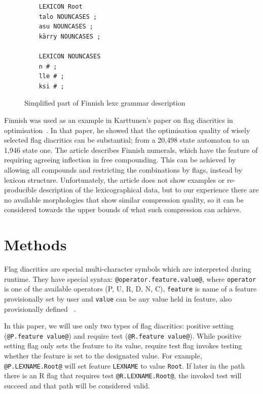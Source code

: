 \documentclass[11pt]{article}
\begin{document}
\begin{figure}
    \centering
    \begin{verbatim}
    LEXICON Root
    talo NOUNCASES ;
    asu NOUNCASES ;
    kärry NOUNCASES ;

    LEXICON NOUNCASES
    n # ;
    lle # ;
    ksi # ;
    \end{verbatim}
    \caption{Simplified part of Finnish lexc grammar description
    \label{fig:lexc-fin}}
\end{figure}

Finnish was used as an example in Karttunen's paper on flag diacritics
in optimisation~. In that paper, he
showed that the optimisation quality of wisely selected flag
diacritics can be substantial; from a 20,498 state automaton to an
1,946 state one. The article describes Finnish numerals, which have
the feature of requiring agreeing inflection in free compounding. This
can be achieved by allowing all compounds and restricting the
combinations by flags, instead by lexicon structure. Unfortunately,
the article does not show examples or re-producible description of the
lexicographical data, but to our experience there are no available
morphologies that show similar compression quality, so it can be
considered towards the upper bounds of what such compression can
achieve.
 

\section{Methods}
\label{sec:methods}

Flag diacritics are special multi-character symbols which are interpreted during runtime. They have special syntax: \verb+@operator.feature.value@+, where
\texttt{operator} is one of the available operators (P, U, R, D, N, C), \texttt{feature} is name of a feature provisionally set by user and \texttt{value} can be any value held in feature, also provisionally defined ~\cite{beesley2003finite}.

In this paper, we will use only two types of flag diacritics: positive
setting (\verb+@P.feature value@+) and require test
(\verb+@R.feature value@+). While positive setting flag only sets the
feature to its value, require test flag invokes testing whether the
feature is set to the designated value.  For example,
\verb+@P.LEXNAME.Root@+ will set feature \texttt{LEXNAME} to value
\texttt{Root}. If later in the path there is an R flag that requires test
\verb+@R.LEXNAME.Root@+, the invoked test will succeed and that path
will be considered valid.
\end{document}
